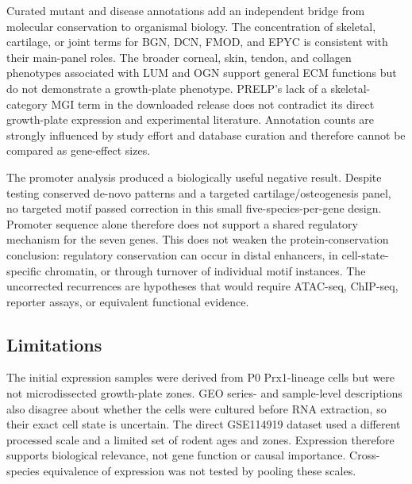 Curated mutant and disease annotations add an independent bridge from molecular
conservation to organismal biology. The concentration of skeletal, cartilage,
or joint terms for BGN, DCN, FMOD, and EPYC is consistent with their main-panel roles.
The broader corneal, skin, tendon, and collagen phenotypes associated with LUM
and OGN support general ECM functions but do not demonstrate a growth-plate
phenotype. PRELP's lack of a skeletal-category MGI term in the downloaded
release does not contradict its direct growth-plate expression and experimental
literature. Annotation counts are strongly influenced by study effort and
database curation and therefore cannot be compared as gene-effect sizes.

The promoter analysis produced a biologically useful negative result. Despite
testing conserved de-novo patterns and a targeted cartilage/osteogenesis panel,
no targeted motif passed correction in this small five-species-per-gene design.
Promoter sequence alone therefore does not support a shared regulatory mechanism
for the seven genes. This does not weaken the protein-conservation conclusion:
regulatory conservation can occur in distal enhancers, in cell-state-specific
chromatin, or through turnover of individual motif instances. The uncorrected
recurrences are hypotheses that would require ATAC-seq, ChIP-seq, reporter
assays, or equivalent functional evidence.

\subsection{Limitations}
\label{subsec:discussion-limitations}

The initial expression samples were derived from P0 Prx1-lineage cells but were
not microdissected growth-plate zones. GEO series- and sample-level descriptions
also disagree about whether the cells were cultured before RNA extraction, so
their exact cell state is uncertain. The direct GSE114919 dataset used a
different processed scale and a limited set of rodent ages and zones. Expression
therefore supports biological relevance, not gene function or causal importance.
Cross-species equivalence of expression was not tested by pooling these scales.

